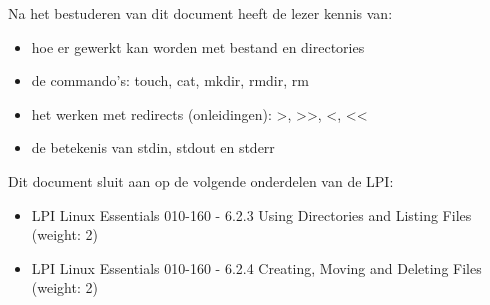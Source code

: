 Na het bestuderen van dit document heeft de lezer kennis van:
\begin{itemize}
\item hoe er gewerkt kan worden met bestand en directories
\item de commando's: touch, cat, mkdir, rmdir, rm
\item het werken met redirects (onleidingen): >, >>, <, <<
\item de betekenis van stdin, stdout en stderr
\end{itemize}

Dit document sluit aan op de volgende onderdelen van de LPI:
\begin{itemize}
\item LPI Linux Essentials 010-160 - 6.2.3 Using Directories and Listing Files (weight: 2)
\item LPI Linux Essentials 010-160 - 6.2.4 Creating, Moving and Deleting Files (weight: 2)
\end{itemize}

